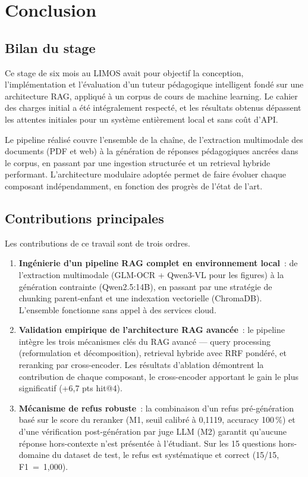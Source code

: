 \documentclass[11pt,a4paper]{article}
\begin{document}
\section{Conclusion}
\label{sec:conclusion}

\subsection{Bilan du stage}

Ce stage de six mois au LIMOS avait pour objectif la conception, l'implémentation et l'évaluation d'un tuteur pédagogique intelligent fondé sur une architecture RAG, appliqué à un corpus de cours de machine learning. Le cahier des charges initial a été intégralement respecté, et les résultats obtenus dépassent les attentes initiales pour un système entièrement local et sans coût d'API.

Le pipeline réalisé couvre l'ensemble de la chaîne, de l'extraction multimodale des documents (PDF et web) à la génération de réponses pédagogiques ancrées dans le corpus, en passant par une ingestion structurée et un retrieval hybride performant. L'architecture modulaire adoptée permet de faire évoluer chaque composant indépendamment, en fonction des progrès de l'état de l'art.

\subsection{Contributions principales}

Les contributions de ce travail sont de trois ordres.

\begin{enumerate}
  \item \textbf{Ingénierie d'un pipeline RAG complet en environnement local}~: de l'extraction multimodale (GLM-OCR + Qwen3-VL pour les figures) à la génération contrainte (Qwen2.5:14B), en passant par une stratégie de chunking parent-enfant et une indexation vectorielle (ChromaDB). L'ensemble fonctionne sans appel à des services cloud.

  \item \textbf{Validation empirique de l'architecture RAG avancée}~: le pipeline intègre les trois mécanismes clés du RAG avancé --- query processing (reformulation et décomposition), retrieval hybride avec RRF pondéré, et reranking par cross-encoder. Les résultats d'ablation démontrent la contribution de chaque composant, le cross-encoder apportant le gain le plus significatif (+6,7 pts hit@4).

  \item \textbf{Mécanisme de refus robuste}~: la combinaison d'un refus pré-génération basé sur le score du reranker (M1, seuil calibré à 0,1119, accuracy 100\,\%) et d'une vérification post-génération par juge LLM (M2) garantit qu'aucune réponse hors-contexte n'est présentée à l'étudiant. Sur les 15 questions hors-domaine du dataset de test, le refus est systématique et correct (15/15, F1~=~1,000).
\end{enumerate}
\end{document}
